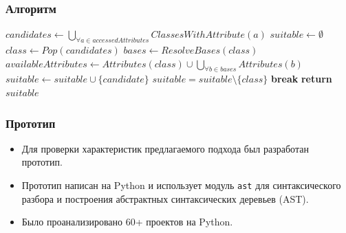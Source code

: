 \documentclass[handout]{beamer}
\begin{document}
\begin{frame}[fragile]
  \frametitle{Алгоритм}

  \begin{algorithm}[H]
    \begin{algorithmic}[1]
    \scriptsize
      \State $candidates \gets \bigcup\limits_{\forall a \in accessedAttributes}
      ClassesWithAttribute(a)$
      \State $suitable \gets \emptyset$
        \State $class \gets Pop(candidates)$
        \State $bases \gets ResolveBases(class)$
        \State $availableAttributes \gets Attributes(class) \cup \bigcup\limits_{\forall{b} \in bases} Attributes(b)$
          \State $suitable \gets suitable \cup \{candidate\}$
        \EndIf
      \EndWhile
            \State $suitable = suitable \setminus \{ class \}$
            \State \textbf{break}
          \EndIf
        \EndFor
      \EndFor
    \State \textbf{return} $suitable$
    \EndFunction
    \end{algorithmic}
  \end{algorithm}

\end{frame}

\begin{frame}
  \frametitle{Прототип}

  \begin{itemize}
      \item Для проверки характеристик предлагаемого подхода был разработан прототип.

      \item Прототип написан на Python и использует модуль \texttt{ast} для
        синтаксического разбора и построения абстрактных синтаксических деревьев
        (AST).

      \item Было проанализировано 60+ проектов на Python.
  \end{itemize}
\end{frame}
\end{document}
